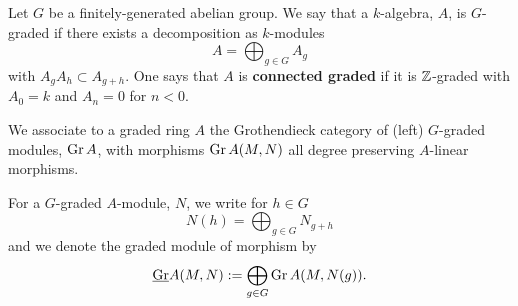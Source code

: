 \begin{definition}
  Let \(G\) be a finitely-generated abelian group. We say that a \(k\)-algebra, \(A\), is \(G\)-graded if there exists a decomposition as \(k\)-modules 
  \begin{displaymath}
    A = \bigoplus_{g \in G} A_g
  \end{displaymath}
  with \(A_g A_h \subset A_{g+h}\). One says that \(A\) is \textbf{connected graded} if it is \(\mathbb{Z}\)-graded with \(A_0 = k\) and \(A_n = 0\) for \(n < 0\). 
\end{definition}




\begin{definition}
  We associate to a graded ring \(A\) the Grothendieck category of (left) \(G\)-graded modules, \(\operatorname{Gr}A\), with morphisms \(\operatorname{Gr}A(M,N)\) all degree preserving \(A\)-linear morphisms.

  For a \(G\)-graded \(A\)-module, \(N\), we write for \(h \in G\)
  \[N(h) = \bigoplus_{g \in G} N_{g + h}\]
  and we denote the graded module of morphism by
  \[\underline{\operatorname{Gr}}A(M,N) := \bigoplus_{g \in G} \operatorname{Gr}A(M,N(g)).\]
\end{definition}

